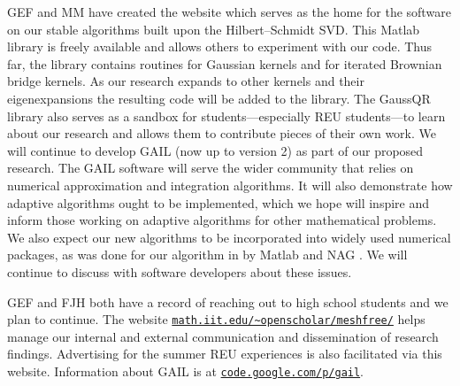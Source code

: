 \documentclass[11pt]{NSFamsart}
\newcommand{\Matlab}{{\sc Matlab}\xspace}
\begin{document}
\begin{description}[leftmargin=0ex]
\item[Creating Software and Collaborating with Software Developers]
GEF and MM have created the website \citep{McCFBG13} which serves as the home for the software on our stable algorithms built upon the Hilbert--Schmidt SVD. This \Matlab library is freely available and allows others to experiment with our code. Thus far, the library contains routines for Gaussian kernels and for iterated Brownian bridge kernels. As our research expands to other kernels and their eigenexpansions the resulting code will be added to the library. The GaussQR library also serves as a sandbox for students---especially REU students---to learn about our research and allows them to contribute pieces of their own work.
We will continue to develop GAIL \citep{ChoEtal14a} (now up to version 2) as part of our proposed research.  The GAIL software will serve the wider community that relies on numerical approximation and integration algorithms.  It will also demonstrate how adaptive algorithms ought to be implemented, which we hope will inspire and inform those working on adaptive algorithms for other mathematical problems.  We also expect our new algorithms to be incorporated into widely used numerical packages, as was done for our algorithm in \cite{HonHic00a} by \Matlab \citep{MAT8.4} and NAG \citep{NAG23}.  We will continue to discuss with software developers about these issues.

\item[Reaching Out]
GEF and FJH both have a record of reaching out to high school students and we plan to continue. The website \href{http://math.iit.edu/~openscholar/meshfree/}{\nolinkurl{math.iit.edu/~openscholar/meshfree/}} helps manage our internal and external communication and dissemination of research findings. Advertising for the summer REU experiences is also facilitated via this website.  Information about GAIL is at \href{http://code.google.com/p/gail}{\nolinkurl{code.google.com/p/gail}}.
\end{description}

\newpage
\clearpage
{}



\renewcommand{\refname}{\hfill \textbf{\large References Cited} \hfill \hfill}                   %
\renewcommand{\bibliofont}{\normalsize}


\end{document}
